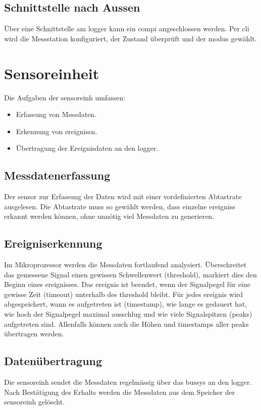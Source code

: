\subsection{Schnittstelle nach Aussen}
Über eine Schnittstelle am \gls{logger} kann ein \gls{compi} angeschlossen werden. Per \gls{cli} wird die Messstation konfiguriert, der Zustand überprüft und der \gls{modus} gewählt.


\section{Sensoreinheit}
Die Aufgaben der \gls{sensoreinh} umfassen:
\begin{itemize}
\item Erfassung von Messdaten.
\item Erkennung von \glspl{ereignis}n.
\item Übertragung der Ereignisdaten an den \gls{logger}.
\end{itemize}


\subsection{Messdatenerfassung}
Der \gls{sensor} zur Erfassung der Daten wird mit einer vordefinierten Abtastrate ausgelesen. Die Abtastrate muss so gewählt werden, dass einzelne \glspl{ereignis} erkannt werden können, ohne unnötig viel Messdaten zu generieren.

\subsection{Ereigniserkennung}
Im Mikroprozessor werden die Messdaten fortlaufend analysiert. Überschreitet das gemessene Signal einen gewissen Schwellenwert (\gls{threshold}), markiert dies den Beginn eines \gls{ereignis}ses. Das \gls{ereignis} ist beendet, wenn der Signalpegel für eine gewisse Zeit (\gls{timeout}) unterhalb des \gls{threshold} bleibt. Für jedes \gls{ereignis} wird abgespeichert, wann es aufgetreten ist (\gls{timestamp}), wie lange es gedauert hat, wie hoch der Signalpegel maximal ausschlug und wie viele Signalspitzen (\glspl{peak}) aufgetreten sind. Allenfalls können auch die Höhen und \glspl{timestamp} aller \glspl{peak} übertragen werden.

\subsection{Datenübertragung}
Die \gls{sensoreinh} sendet die Messdaten regelmässig über das \gls{bussys} an den \gls{logger}. Nach Bestätigung des Erhalts werden die Messdaten aus dem Speicher der \gls{sensoreinh} gelöscht.

